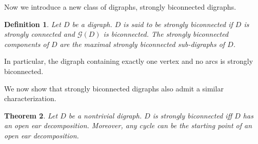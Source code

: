 \documentclass{article}
\newtheorem{thm}{Theorem}
\newtheorem{defn}[thm]{Definition}
\begin{document}
\smallskip

\noindent Now we introduce a new class of digraphs, strongly
biconnected digraphs.

\begin{defn}
Let $D$ be a digraph. $D$ is said to be strongly biconnected if $D$
is strongly connected and $\mathcal{G}(D)$ is biconnected. The
strongly biconnected components of $D$ are the maximal strongly
biconnected sub-digraphs of $D$.
\end{defn}
In particular, the digraph containing exactly one vertex and no arcs
is strongly biconnected.

\noindent We now show that strongly biconnected digraphs also admit
a similar characterization.

\begin{thm}\label{thm:bi-strong}
Let $D$ be a nontrivial digraph. $D$ is strongly biconnected iff $D$
has an open ear decomposition. Moreover, any cycle can be the
starting point of an open ear decomposition.
\end{thm}
\end{document}
